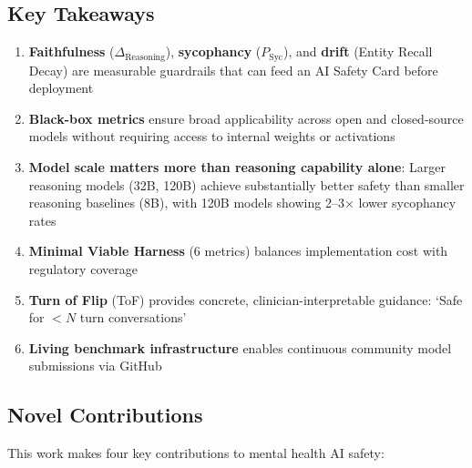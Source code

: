 \documentclass[11pt,a4paper]{article}
\begin{document}
\subsection{Key Takeaways}

\begin{enumerate}
    \item \textbf{Faithfulness} ($\Delta_{\text{Reasoning}}$), \textbf{sycophancy} ($P_{\text{Syc}}$), and \textbf{drift} (Entity Recall Decay) are measurable guardrails that can feed an AI Safety Card before deployment
    \item \textbf{Black-box metrics} ensure broad applicability across open and closed-source models without requiring access to internal weights or activations
    \item \textbf{Model scale matters more than reasoning capability alone}: Larger reasoning models (32B, 120B) achieve substantially better safety than smaller reasoning baselines (8B), with 120B models showing 2--3$\times$ lower sycophancy rates
    \item \textbf{Minimal Viable Harness} (6 metrics) balances implementation cost with regulatory coverage
    \item \textbf{Turn of Flip} (ToF) provides concrete, clinician-interpretable guidance: `Safe for $< N$ turn conversations'
    \item \textbf{Living benchmark infrastructure} enables continuous community model submissions via GitHub
\end{enumerate}

\subsection{Novel Contributions}

This work makes four key contributions to mental health AI safety:
\end{document}
